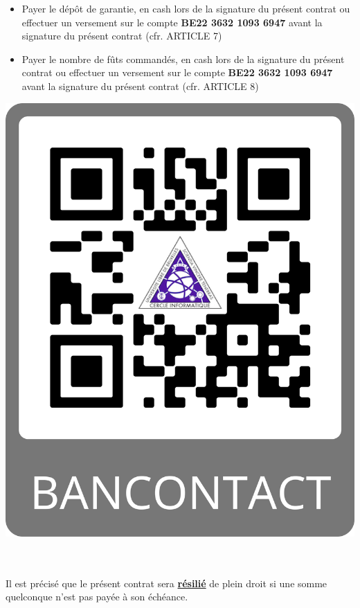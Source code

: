\documentclass{article}
\begin{document}
\begin{minipage}{0.6\textwidth}
\begin{itemize}
    \item Payer le dépôt de garantie, en cash lors de la signature du présent contrat ou effectuer un versement sur le compte \textbf{BE22 3632 1093 6947} avant la signature du présent contrat (cfr. ARTICLE 7)
    \item Payer le nombre de fûts commandés, en cash lors de la signature du présent contrat ou effectuer un versement sur le compte \textbf{BE22 3632 1093 6947} avant la signature du présent contrat (cfr. ARTICLE 8)
\end{itemize}
\end{minipage}
\begin{minipage}{0.4\textwidth}\raggedleft
\includegraphics[scale=0.04]{images/QRCodeBancontact.png}
\end{minipage}\\\\
Il est précisé que le présent contrat sera \textbf{\underline{résilié}} de plein droit si une somme quelconque n’est pas payée à son échéance.
\end{document}
